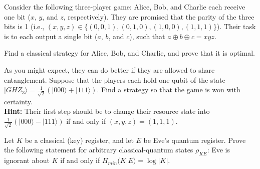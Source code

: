 \documentclass[a4paper,10pt,landscape,twocolumn]{scrartcl}
\newcommand{\ket}[1]{| #1 \rangle}
\begin{document}
\begin{exercise}
Consider the following three-player game: Alice, Bob, and Charlie each receive one bit ($x$, $y$, and $z$, respectively). They are promised that the parity of the three bits is 1 (i.e., $(x,y,z) \in \{(0,0,1), (0,1,0), (1,0,0), (1,1,1)\}$). Their task is to each output a single bit ($a$, $b$, and $c$), such that $a \oplus b \oplus c = xyz$.


\begin{subex}
Find a classical strategy for Alice, Bob, and Charlie, and prove that it is optimal.
\end{subex}

\begin{subex}
As you might expect, they can do better if they are allowed to share entanglement. Suppose that the players each hold one qubit of the state $\ket{GHZ_3} = \frac{1}{\sqrt{2}}(\ket{000} + \ket{111})$. Find a strategy so that the game is won with certainty.
\\\textbf{Hint:} Their first step should be to change their resource state into $\frac{1}{\sqrt{2}}(\ket{000} - \ket{111})$ if and only if $(x,y,z) = (1,1,1)$.
\end{subex}

\end{exercise}

\begin{exercise}
	Let $K$ be a classical (key) register, and let $E$ be Eve's quantum register. Prove the following statement for arbitrary classical-quantum states $\rho_{KE}$: Eve is ignorant about $K$ if and only if $H_{min}(K|E) = \log|K|$.
\end{exercise}
\end{document}

